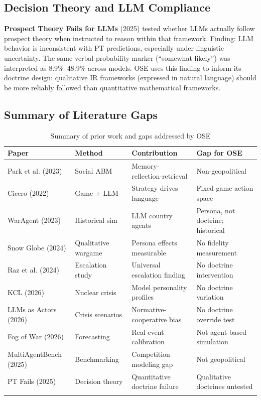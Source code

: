 \documentclass[12pt, a4paper]{article}
\begin{document}
\subsection{Decision Theory and LLM Compliance}

\textbf{Prospect Theory Fails for LLMs} (2025) tested whether LLMs actually follow prospect theory when instructed to reason within that framework. Finding: LLM behavior is inconsistent with PT predictions, especially under linguistic uncertainty. The same verbal probability marker (``somewhat likely'') was interpreted as 8.9\%--48.9\% across models. OSE uses this finding to inform its doctrine design: qualitative IR frameworks (expressed in natural language) should be more reliably followed than quantitative mathematical frameworks.

\subsection{Summary of Literature Gaps}

\begin{longtable}{p{3.5cm} p{3.5cm} p{4cm} p{2.5cm}}
\toprule
\textbf{Paper} & \textbf{Method} & \textbf{Contribution} & \textbf{Gap for OSE} \\
\midrule
Park et al. (2023) & Social ABM & Memory-reflection-retrieval & Non-geopolitical \\
Cicero (2022) & Game + LLM & Strategy drives language & Fixed game action space \\
WarAgent (2023) & Historical sim & LLM country agents & Persona, not doctrine; historical \\
Snow Globe (2024) & Qualitative wargame & Persona effects measurable & No fidelity measurement \\
Raz et al. (2024) & Escalation study & Universal escalation finding & No doctrine intervention \\
KCL (2026) & Nuclear crisis & Model personality profiles & No doctrine variation \\
LLMs as Actors (2026) & Crisis scenarios & Normative-cooperative bias & No doctrine override test \\
Fog of War (2026) & Forecasting & Real-event calibration & Not agent-based simulation \\
MultiAgentBench (2025) & Benchmarking & Competition modeling gap & Not geopolitical \\
PT Fails (2025) & Decision theory & Quantitative doctrine failure & Qualitative doctrines untested \\
\bottomrule
\caption{Summary of prior work and gaps addressed by OSE}
\end{longtable}
\end{document}
